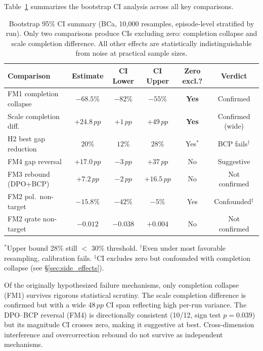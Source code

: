 \documentclass[11pt,a4paper]{article}
\newcommand{\pp}{\,pp}
\begin{document}
Table~\ref{tab:bootstrap} summarizes the bootstrap CI analysis across all key comparisons.

\begin{table}[t]
\centering
\caption{Bootstrap 95\% CI summary (BCa, 10,000 resamples, episode-level stratified by run). Only two comparisons produce CIs excluding zero: completion collapse and scale completion difference. All other effects are statistically indistinguishable from noise at practical sample sizes.}
\label{tab:bootstrap}
\small
\begin{tabular}{@{}lccccc@{}}
\toprule
Comparison & Estimate & CI Lower & CI Upper & Zero excl.? & Verdict \\
\midrule
FM1 completion collapse   & $-68.5\%$ & $-82\%$  & $-55\%$  & \textbf{Yes} & Confirmed \\
Scale completion diff.     & $+24.8\pp$ & $+1\pp$ & $+49\pp$ & \textbf{Yes} & Confirmed (wide) \\
H2 best gap reduction      & $20\%$    & $12\%$   & $28\%$   & Yes$^*$       & BCP fails$^\dagger$ \\
\midrule
FM4 gap reversal           & $+17.0\pp$ & $-3\pp$ & $+37\pp$ & No           & Suggestive \\
FM3 rebound (DPO+BCP)     & $+7.2\pp$  & $-2\pp$ & $+16.5\pp$ & No         & Not confirmed \\
FM2 pol.\ non-target       & $-15.8\%$ & $-42\%$  & $-5\%$   & Yes          & Confounded$^\ddagger$ \\
FM2 qrate non-target       & $-0.012$  & $-0.038$ & $+0.004$ & No           & Not confirmed \\
\bottomrule
\end{tabular}

\vspace{2pt}
{\footnotesize $^*$Upper bound 28\% still $<$ 30\% threshold. $^\dagger$Even under most favorable resampling, calibration fails. $^\ddagger$CI excludes zero but confounded with completion collapse (see \S\ref{sec:side_effects}).}
\end{table}

Of the originally hypothesized failure mechanisms, only completion collapse (FM1) survives rigorous statistical scrutiny.
The scale completion difference is confirmed but with a wide 48$\pp$ CI span reflecting high per-run variance.
The DPO--BCP reversal (FM4) is directionally consistent (10/12, sign test $p=0.039$) but its magnitude CI crosses zero, making it suggestive at best.
Cross-dimension interference and overcorrection rebound do not survive as independent mechanisms.
\end{document}
